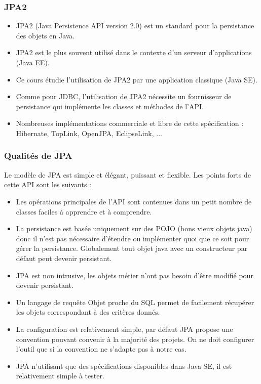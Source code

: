 \documentclass[xcolor=pdftex,x11names,table]{beamer}
\begin{document}
		\begin{frame}
    \frametitle{JPA2}
		  \begin{itemize}
		  	\item JPA2 (Java Persistence API version 2.0) est un standard pour la persistance des objets en Java.
		  	\item JPA2 est le plus souvent utilisé dans le contexte d’un serveur d’applications (Java EE).
				\item Ce cours étudie l’utilisation de JPA2 par une application classique (Java SE).
				\item Comme pour JDBC, l’utilisation de JPA2 nécessite un fournisseur de persistance qui 
				implémente les classes et méthodes de l’API.
				\item Nombreuses implémentations commerciale et libre de cette spécification : Hibernate, TopLink, OpenJPA, EclipseLink, ...
		  \end{itemize}	
   	\end{frame}

  \begin{frame}[allowframebreaks]
    \frametitle{Qualités de JPA}
    Le modèle de JPA est simple et élégant, puissant et flexible. Les points forts de cette API sont les suivants : 
    \begin{itemize}
		  \item Les opérations principales de l'API sont contenues dans un petit nombre de classes faciles à apprendre et à comprendre.
		  \item La persistance est basée uniquement sur des POJO (bons vieux objets java) donc il n'est pas nécessaire d'étendre ou implémenter 
		  quoi que ce soit pour gérer la persistance. Globalement tout objet java avec un constructeur par défaut peut devenir persistant.
		  \item JPA est non intrusive, les objets métier n'ont pas besoin d'être modifié pour devenir persistant.
		  \item Un langage de requête Objet proche du SQL permet de facilement récupérer les objets correspondant à des critères donnés.
		  \item La configuration est relativement simple, par défaut JPA propose une convention pouvant convenir à la majorité des projets. 
		  On ne doit configurer l'outil que si la convention ne s'adapte pas à notre cas.
		  \item JPA n'utilisant que des spécifications disponibles dans Java SE, il est relativement simple à tester.
		\end{itemize}
   \end{frame}
\end{document}
